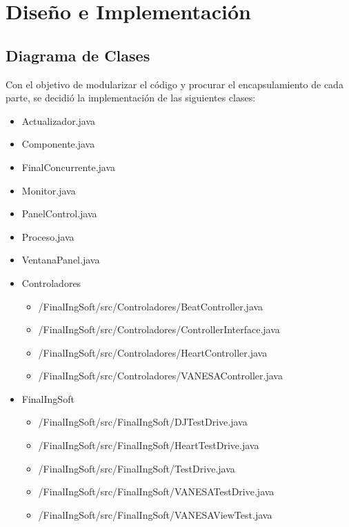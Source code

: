 \documentclass[10pt]{article} %
\begin{document}


\section{Diseño e Implementación}

\subsection{Diagrama de Clases}
Con el objetivo de modularizar el código y procurar el encapsulamiento de cada parte, se decidió la implementación de las siguientes clases:
\begin{itemize}
\item Actualizador.java
\item Componente.java
\item FinalConcurrente.java
\item Monitor.java
\item PanelControl.java
\item Proceso.java
\item VentanaPanel.java

\item Controladores
\begin{itemize}
\item /FinalIngSoft/src/Controladores/BeatController.java
\item /FinalIngSoft/src/Controladores/ControllerInterface.java
\item /FinalIngSoft/src/Controladores/HeartController.java
\item /FinalIngSoft/src/Controladores/VANESAController.java

\end{itemize}
\item FinalIngSoft
\begin{itemize}
\item /FinalIngSoft/src/FinalIngSoft/DJTestDrive.java
\item /FinalIngSoft/src/FinalIngSoft/HeartTestDrive.java
\item /FinalIngSoft/src/FinalIngSoft/TestDrive.java
\item /FinalIngSoft/src/FinalIngSoft/VANESATestDrive.java
\item /FinalIngSoft/src/FinalIngSoft/VANESAViewTest.java


\end{itemize}
\end{itemize}
\end{document}
